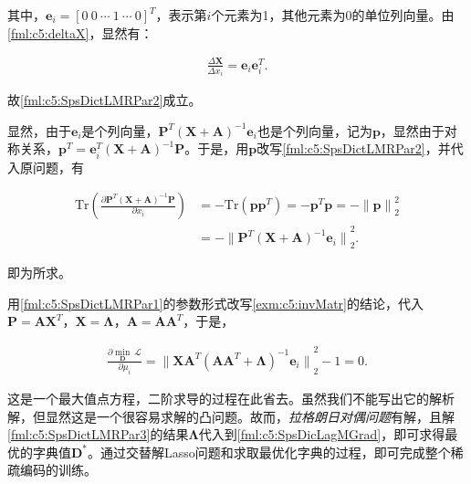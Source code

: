\begin{example}
	其中，$\mathbf{e}_i=[0~0~\cdots~1~\cdots~0]^T$，表示第$i$个元素为1，其他元素为0的单位列向量。由\eqref{fml:c5:deltaX}，显然有：
	
	\begin{equation}\label{fml:c5:uniteDelta}
		\begin{aligned}
			\frac{\Delta \mathbf{X}}{\Delta x_i} = \mathbf{e}_i\mathbf{e}_i^T.
		\end{aligned}
	\end{equation}
	
	故\eqref{fml:c5:SpsDictLMRPar2}成立。
	
	显然，由于$\mathbf{e}_i$是个列向量，$\mathbf{P}^T (\mathbf{X}+\mathbf{A})^{-1} \mathbf{e}_i$也是个列向量，记为$\mathbf{p}$，显然由于对称关系，$\mathbf{p}^T = \mathbf{e}_i^T (\mathbf{X}+\mathbf{A})^{-1} \mathbf{P}$。于是，用$\mathbf{p}$改写\eqref{fml:c5:SpsDictLMRPar2}，并代入原问题，有
	
	\begin{equation}\label{fml:c5:Delatoriginal}
		\begin{aligned}
			\mathrm{Tr}\left( \frac{\partial \mathbf{P}^T (\mathbf{X}+\mathbf{A})^{-1} \mathbf{P} }{\partial x_i} \right) &= -\mathrm{Tr}\left( \mathbf{p}\mathbf{p}^T \right) = -\mathbf{p}^T\mathbf{p} = -{\lVert \mathbf{p} \rVert}^2_2 \\
			&= -{\lVert \mathbf{P}^T (\mathbf{X}+\mathbf{A})^{-1} \mathbf{e}_i \rVert}^2_2.
		\end{aligned}
	\end{equation}
	
	即为所求。
\end{example}

用\eqref{fml:c5:SpsDictLMRPar1}的参数形式改写\autoref{exm:c5:invMatr}的结论，代入$\mathbf{P}=\mathbf{A}\mathbf{X}^T$，$\mathbf{X}=\bm{\Lambda}$，$\mathbf{A}=\mathbf{A}\mathbf{A}^T$，于是，

\begin{equation}\label{fml:c5:SpsDictLMRPar3}
	\begin{aligned}
		\frac{\partial \min\limits_{\mathbf{D}}~\mathcal{L}}{\partial \mu_i} = {\lVert \mathbf{X}\mathbf{A}^T (\mathbf{A}\mathbf{A}^T+\bm{\Lambda})^{-1} \mathbf{e}_i \rVert}^2_2 - 1 = 0.
	\end{aligned}
\end{equation}

这是一个最大值点方程，二阶求导的过程在此省去。虽然我们不能写出它的解析解，但显然这是一个很容易求解的凸问题。故而，\emph{拉格朗日对偶问题}有解，且解\eqref{fml:c5:SpsDictLMRPar3}的结果$\bm{\Lambda}$代入到\eqref{fml:c5:SpsDicLagMGrad}，即可求得最优的字典值$\mathbf{D}^{\ast}$。通过交替解Lasso问题和求取最优化字典的过程，即可完成整个稀疏编码的训练。


